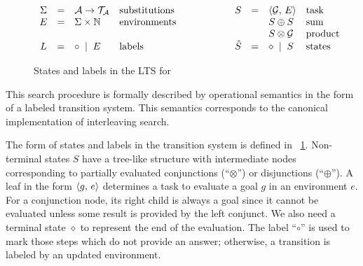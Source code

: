 \begin{figure}[t]
\centering
\[
\begin{array}{ccllcccll}
  \Sigma & = & \mathcal{A} \to \mathcal{T}_\mathcal{A} & \mbox{substitutions} &\qquad\qquad&        S & = & \langle \mathcal{G} ,\, E \rangle & \mbox{task} \\
       E & = & \Sigma \times \mathbb{N}              & \mbox{environments}  &\qquad\qquad&          &   & S \oplus S              & \mbox{sum} \\
         &   &                                       &                      &\qquad\qquad&          &   & S \otimes \mathcal{G}   & \mbox{product} \\
       L & = & \circ \; \mid \; E      & \mbox{labels}        &\qquad\qquad&  \hat{S} & = & \diamond \; \mid \; S   & \mbox{states} \\
\end{array}
\]
\caption{States and labels in the LTS for \mK}
\label{fig:operanional_semantics_states_labels}
\end{figure}

This search procedure is formally described by operational semantics in the form of a labeled transition system.
This semantics corresponds to the canonical implementation of interleaving search. 

The form of states and labels in the transition system is defined in \figureword~\ref{fig:operanional_semantics_states_labels}.
Non-terminal states $S$ have a tree-like structure with intermediate nodes corresponding to partially evaluated conjunctions
(``$\otimes$'') or disjunctions (``$\oplus$'').
A leaf in the form $\langle g ,\, e \rangle$ determines a task to evaluate a goal $g$ in an environment $e$. For a conjunction node, its right child
is always a goal since it cannot be evaluated unless some result is provided by the left conjunct.
We also need a terminal state $\diamond$ to represent the end of the evaluation.
The label ``$\circ$'' is used to mark those steps which do not provide an answer; otherwise, a transition is labeled by an updated
environment.

